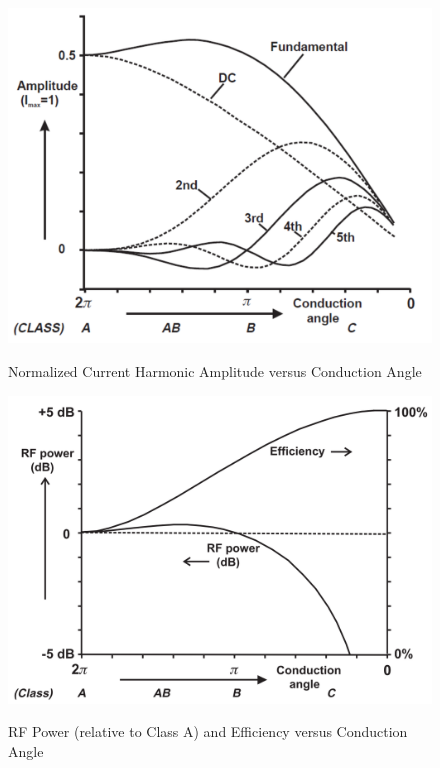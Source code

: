 \begin{figure}
  \centering
  \includegraphics[width=6in]{figures/classes/bias_current_harmonic}\\
  \caption{Normalized Current Harmonic Amplitude versus Conduction Angle \cite{C.Cripps2006}}
  \label{fig:bias_current_harmonic}
\end{figure}

\begin{figure}
  \centering
  \includegraphics[width=6in]{figures/classes/bias_power_eff}\\
  \caption{RF Power (relative to Class A) and Efficiency versus Conduction Angle \cite{C.Cripps2006}}
  \label{fig:bias_power_eff}
\end{figure}

